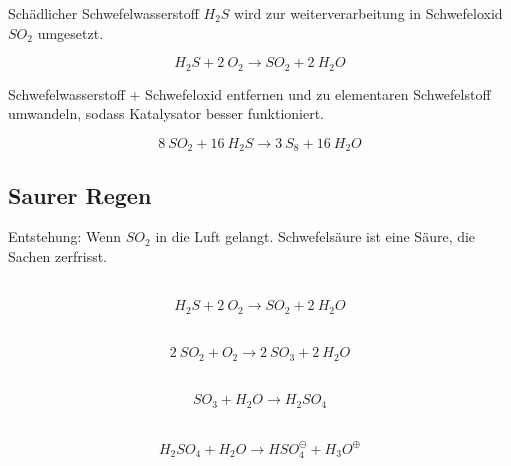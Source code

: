 \begin{definition}
	Schädlicher Schwefelwasserstoff $H_2S$ wird zur weiterverarbeitung in Schwefeloxid $SO_2$ umgesetzt.
	
	{\large\begin{equation}
			H_2S + 2\ O_2 \rightarrow SO_2 + 2\ H_2O
		\end{equation}}
\end{definition}

\begin{definition}
	Schwefelwasserstoff + Schwefeloxid entfernen und zu elementaren Schwefelstoff umwandeln, sodass Katalysator besser funktioniert.
	
	{\large\begin{equation}
		8\ SO_2 + 16\ H_2S \rightarrow 3\ S_8 + 16\ H_2O
		\end{equation}}
\end{definition}

\subsection{Saurer Regen}

Entstehung: Wenn $SO_2$ in die Luft gelangt. Schwefelsäure ist eine Säure, die Sachen zerfrisst.

\begin{definition}[Verbrennung]\leavevmode\\
	{\large\begin{equation}
		H_2S + 2\ O_2 \rightarrow SO_2 + 2\ H_2O
		\end{equation}}
\end{definition}

\begin{definition}\leavevmode\\
	{\large\begin{equation}
		2\ SO_2 + O_2 \rightarrow 2\ SO_3 + 2\ H_2O
		\end{equation}}
\end{definition}

\begin{definition}\leavevmode\\
	{\large\begin{equation}
		SO_3 + H_2O \rightarrow H_2SO_4
		\end{equation}}
\end{definition}

\begin{definition}\leavevmode\\
	{\large\begin{equation}
		H_2SO_4 + H_2O \rightarrow HSO_4^\ominus + H_3O^\oplus
		\end{equation}}
\end{definition}

